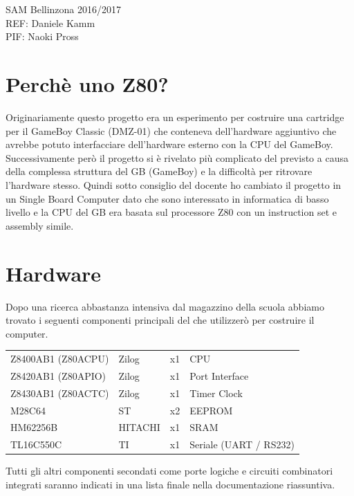 \documentclass[final, ms, a4paper, 11pt]{memoir}
\newcommand\ddate{01.01.1970}
\begin{document}
 \\\\
\noindent SAM Bellinzona 2016/2017 \\
\noindent REF: Daniele Kamm \\
\noindent PIF: Naoki Pross \\
\vspace{5mm}

\renewcommand\ddate{30.01.2017}
\section{Perch\`e uno Z80?}
Originariamente questo progetto era un esperimento per costruire una
cartridge per il GameBoy Classic (DMZ-01) che conteneva dell'hardware
aggiuntivo che avrebbe potuto interfacciare dell'hardware esterno con la CPU
del GameBoy. Successivamente per\`o il progetto si \`e rivelato pi\`u
complicato del previsto a causa della complessa struttura del GB (GameBoy) e
la difficolt\`a per ritrovare l'hardware stesso. Quindi sotto consiglio del
docente ho cambiato il progetto in un Single Board Computer dato che sono
interessato in informatica di basso livello e la CPU del GB era basata sul
processore Z80 con un instruction set e assembly simile.

\renewcommand\ddate{09.02.2017}
\section{Hardware}
Dopo una ricerca abbastanza intensiva dal magazzino della scuola abbiamo trovato
i seguenti componenti principali del che utilizzer\`o per costruire il computer.
\begin{table}[h!] \centering
\begin{tabular}{ l l l l }
    Z8400AB1 (Z80ACPU) & Zilog   & x1 & CPU \\
    Z8420AB1 (Z80APIO) & Zilog   & x1 & Port Interface \\
    Z8430AB1 (Z80ACTC) & Zilog   & x1 & Timer Clock \\
    M28C64             & ST      & x2 & EEPROM \\
    HM62256B           & HITACHI & x1 & SRAM \\
    TL16C550C          & TI      & x1 & Seriale (UART / RS232) \\
\end{tabular}
\end{table}

Tutti gli altri componenti secondati come porte logiche e circuiti combinatori
integrati saranno indicati in una lista finale nella documentazione riassuntiva.
\end{document}
